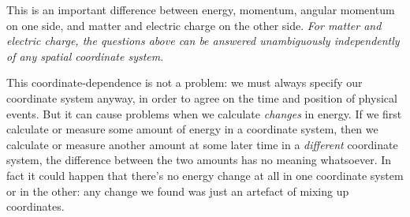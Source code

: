 \documentclass[a4paper,12pt,%
onecolumn,oneside,titlepage,%
british%
]{memoir}
\renewcommand*{\|}[1][]{\nonscript\:#1\vert\nonscript\:\mathopen{}}
\begin{document}
This is an important difference between energy, momentum, angular momentum on one side, and matter and electric charge on the other side. \emph{For matter and electric charge, the questions above can be answered unambiguously independently of any spatial coordinate system}.
%

This coordinate-dependence is not a problem: we must always specify our coordinate system anyway, in order to agree on the time and position of physical events. But it can cause problems when we calculate \emph{changes} in energy. If we first calculate or measure some amount of energy in a coordinate system, then we calculate or measure another amount at some later time in a \emph{different} coordinate system, the difference between the two amounts has no meaning whatsoever. In fact it could happen that there's no energy change at all in one coordinate system or in the other: any change we found was just an artefact of mixing up coordinates.
\end{document}
